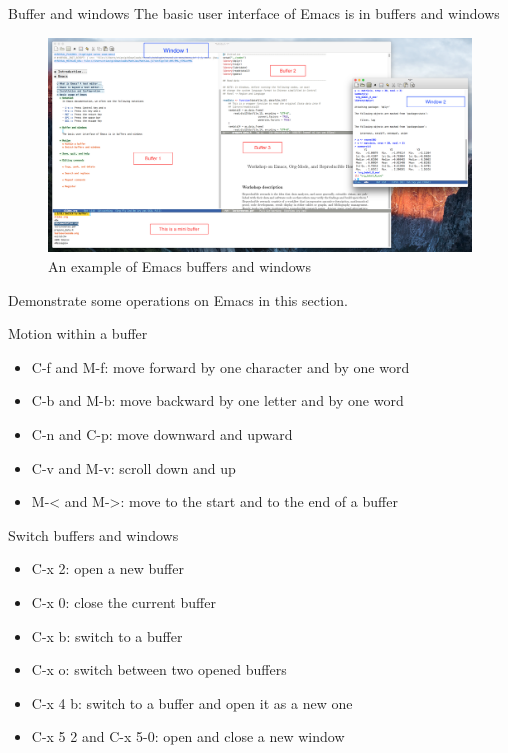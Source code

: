 \documentclass[presentation]{beamer}
\begin{document}
\begin{frame}[label={sec:org59c486d}]{Buffer and windows}
The basic user interface of Emacs is in buffers and windows

\begin{figure}[htbp]
\centering
\includegraphics[width=1.0\textwidth,height=0.8\textheight]{figure/buffer_example.png}
\caption{An example of Emacs buffers and windows}
\end{figure}

\begin{NOTES}
Demonstrate some operations on Emacs in this section.
\end{NOTES}
\end{frame}

\begin{frame}[label={sec:org47e65a3}]{Motion within a buffer}
\begin{itemize}
\item C-f and M-f: move forward by one character and by one word
\item C-b and M-b: move backward by one letter and by one word
\item C-n and C-p: move downward and upward
\item C-v and M-v: scroll down and up
\item M-< and M->: move to the start and to the end of a buffer
\end{itemize}
\end{frame}

\begin{frame}[label={sec:org0802c6e}]{Switch buffers and windows}
\begin{itemize}
\item C-x 2: open a new buffer
\item C-x 0: close the current buffer
\item C-x b: switch to a buffer
\item C-x o: switch between two opened buffers
\item C-x 4 b: switch to a buffer and open it as a new one
\item C-x 5 2 and C-x 5-0: open and close a new window
\end{itemize}
\end{frame}
\end{document}
